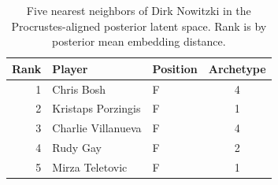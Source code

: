 \begin{table}[htbp]
  \centering\small
  \begin{tabular}{rllc}
    \toprule
    Rank & Player & Position & Archetype \\
    \midrule
    1 & Chris Bosh & F & 4 \\
    2 & Kristaps Porzingis & F & 1 \\
    3 & Charlie Villanueva & F & 4 \\
    4 & Rudy Gay & F & 2 \\
    5 & Mirza Teletovic & F & 1 \\
    \bottomrule
  \end{tabular}
  \caption{Five nearest neighbors of Dirk Nowitzki in the Procrustes-aligned posterior latent space. Rank is by posterior mean embedding distance.}
  \label{tab:Dirk_Nowitzki_neighbors}
\end{table}

